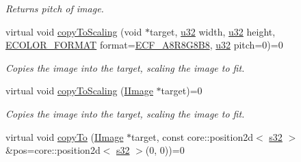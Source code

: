 \begin{DoxyCompactItemize}
\begin{DoxyCompactList}\small\item\em Returns pitch of image. \end{DoxyCompactList}\item 
virtual void \hyperlink{classirr_1_1video_1_1IImage_a6f57153218f5ecd4da9aeb5a37f92f59}{copy\+To\+Scaling} (void $\ast$target, \hyperlink{namespaceirr_a0416a53257075833e7002efd0a18e804}{u32} width, \hyperlink{namespaceirr_a0416a53257075833e7002efd0a18e804}{u32} height, \hyperlink{namespaceirr_1_1video_a1d5e487888c32b1674a8f75116d829ed}{E\+C\+O\+L\+O\+R\+\_\+\+F\+O\+R\+M\+AT} format=\hyperlink{namespaceirr_1_1video_a1d5e487888c32b1674a8f75116d829eda55c57d63efff39efe33ee733fe962df0}{E\+C\+F\+\_\+\+A8\+R8\+G8\+B8}, \hyperlink{namespaceirr_a0416a53257075833e7002efd0a18e804}{u32} pitch=0)=0\hypertarget{classirr_1_1video_1_1IImage_a6f57153218f5ecd4da9aeb5a37f92f59}{}\label{classirr_1_1video_1_1IImage_a6f57153218f5ecd4da9aeb5a37f92f59}

\begin{DoxyCompactList}\small\item\em Copies the image into the target, scaling the image to fit. \end{DoxyCompactList}\item 
virtual void \hyperlink{classirr_1_1video_1_1IImage_aa969bf7167171a18003e26ff7876febd}{copy\+To\+Scaling} (\hyperlink{classirr_1_1video_1_1IImage}{I\+Image} $\ast$target)=0\hypertarget{classirr_1_1video_1_1IImage_aa969bf7167171a18003e26ff7876febd}{}\label{classirr_1_1video_1_1IImage_aa969bf7167171a18003e26ff7876febd}

\begin{DoxyCompactList}\small\item\em Copies the image into the target, scaling the image to fit. \end{DoxyCompactList}\item 
virtual void \hyperlink{classirr_1_1video_1_1IImage_ae4a8a2fc245f691224825aceffd53b8a}{copy\+To} (\hyperlink{classirr_1_1video_1_1IImage}{I\+Image} $\ast$target, const core\+::position2d$<$ \hyperlink{namespaceirr_ac66849b7a6ed16e30ebede579f9b47c6}{s32} $>$ \&pos=core\+::position2d$<$ \hyperlink{namespaceirr_ac66849b7a6ed16e30ebede579f9b47c6}{s32} $>$(0, 0))=0\hypertarget{classirr_1_1video_1_1IImage_ae4a8a2fc245f691224825aceffd53b8a}{}\label{classirr_1_1video_1_1IImage_ae4a8a2fc245f691224825aceffd53b8a}


\end{DoxyCompactItemize}
